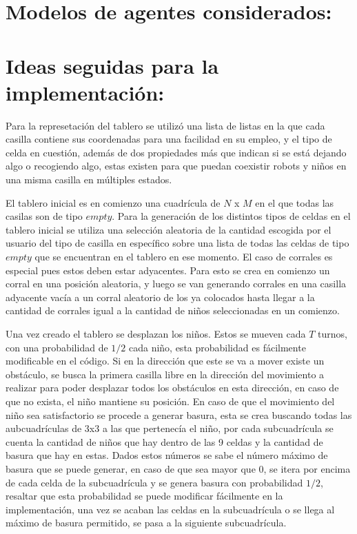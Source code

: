 \documentclass[titlepage,11pt]{scrartcl}
\begin{document}
\section{Modelos de agentes considerados:}

\section{Ideas seguidas para la implementación:}
Para la represetación del tablero se utilizó una lista de listas en la que cada casilla contiene sus coordenadas para una facilidad en su empleo, y el tipo de celda en cuestión, además de dos propiedades más que indican si se está dejando algo o recogiendo algo, estas existen para que puedan coexistir robots y niños en una misma casilla en múltiples estados.

El tablero inicial es en comienzo una cuadrícula de $N$ x $M$ en el que todas las casilas son de tipo $empty$. Para la generación de los distintos tipos de celdas en el tablero inicial se utiliza una selección aleatoria de la cantidad escogida por el usuario del tipo de casilla en específico sobre una lista de todas las celdas de tipo $empty$ que se encuentran en el tablero en ese momento. El caso de corrales es especial pues estos deben estar adyacentes. Para esto se crea en comienzo un corral en una posición aleatoria, y luego se van generando corrales en una casilla adyacente vacía a un corral aleatorio de los ya colocados hasta llegar a la cantidad de corrales igual a la cantidad de niños seleccionadas en un comienzo.

Una vez creado el tablero se desplazan los niños. Estos se mueven cada $T$ turnos, con una probabilidad de $1/2$ cada niño, esta probabilidad es fácilmente modificable en el código. Si en la dirección que este se va a mover existe un obstáculo, se busca la primera casilla libre en la dirección del movimiento a realizar para poder desplazar todos los obstáculos en esta dirección, en caso de que no exista, el niño mantiene su posición. En caso de que el movimiento del niño sea satisfactorio se procede a generar basura, esta se crea buscando todas las aubcuadrículas de $3$x$3$ a las que pertenecía el niño, por cada subcuadrícula se cuenta la cantidad de niños que hay dentro de las 9 celdas y la cantidad de basura que hay en estas. Dados estos números se sabe el número máximo de basura que se puede generar, en caso de que sea mayor que 0, se itera por encima de cada celda de la subcuadrícula y se genera basura con probabilidad $1/2$, resaltar que esta probabilidad se puede modificar fácilmente en la implementación, una vez se acaban las celdas en la subcuadrícula o se llega al máximo de basura permitido, se pasa a la siguiente subcuadrícula.
\end{document}
